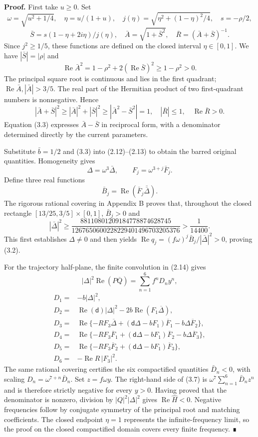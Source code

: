 \documentclass[a4paper,11pt]{article}
\begin{document}
\textbf{Proof.} First take \(u\ge0\). Set
\[
\omega=\sqrt{u^2+1/4},\quad \eta=u/(1+u),\quad
j(\eta)=\sqrt{\eta^2+(1-\eta)^2/4},\quad s=-\rho/2,
\]
\[
\bar S=s(1-\eta+2i\eta)/j(\eta),\quad
\bar A=\sqrt{1+\bar S^2},\quad \bar R=(\bar A+\bar S)^{-1}.
\tag{3.3}
\]
Since \(j^2\ge1/5\), these functions are defined on the closed interval \(\eta\in[0,1]\). We have \(|\bar S|=|\rho|\) and
\[
\operatorname{Re}\bar A^2
=1-\rho^2+2(\operatorname{Re}\bar S)^2\ge1-\rho^2>0.
\]
The principal square root is continuous and lies in the first quadrant; \(\operatorname{Re}\bar A,|\bar A|>3/5\). The real part of the Hermitian product of two first-quadrant numbers is nonnegative. Hence
\[
|\bar A+\bar S|^2\ge|\bar A|^2+|\bar S|^2
\ge|\bar A^2-\bar S^2|=1,\quad
|\bar R|\le1,\quad\operatorname{Re}\bar R>0.
\]
Equation (3.3) expresses \(\bar A-\bar S\) in reciprocal form, with a denominator determined directly by the current parameters.

Substitute \(\bar b=1/2\) and (3.3) into (2.12)–(2.13) to obtain the barred original quantities. Homogeneity gives
\[
\Delta=\omega^3\bar\Delta,\qquad F_j=\omega^{3+j}\bar F_j.
\tag{3.4}
\]
Define three real functions
\[
\bar B_j=\operatorname{Re}(\bar F_j\overline{\bar\Delta}).
\tag{3.5}
\]
The rigorous rational covering in Appendix B proves that, throughout the closed rectangle \([13/25,3/5]\times[0,1]\), \(\bar B_j>0\) and
\[
|\bar\Delta|^2\ge
\frac{88110801209184778874628745}{1267650600228229401496703205376}
>\frac1{14400}.
\tag{3.6}
\]
This first establishes \(\Delta\ne0\) and then yields
\(\operatorname{Re}q_j=(f\omega)^j\bar B_j/|\bar\Delta|^2>0\), proving (3.2).

For the trajectory half-plane, the finite convolution in (2.14) gives
\[
|\Delta|^2\operatorname{Re}(P\overline Q)
=\sum_{n=1}^6 f^nD_ny^n,
\tag{3.7}
\]
\[
\begin{aligned}
D_1={}&-b|\Delta|^2,\\
D_2={}&\operatorname{Re}(\mathsf d)|\Delta|^2-2b\operatorname{Re}(F_1\overline\Delta),\\
D_3={}&\operatorname{Re}\{-RF_3\overline\Delta+
(\mathsf d\Delta-bF_1)\overline F_1-b\Delta\overline F_2\},\\
D_4={}&\operatorname{Re}\{-RF_3\overline F_1+
(\mathsf d\Delta-bF_1)\overline F_2-b\Delta\overline F_3\},\\
D_5={}&\operatorname{Re}\{-RF_3\overline F_2+
(\mathsf d\Delta-bF_1)\overline F_3\},\\
D_6={}&-\operatorname{Re}R\,|F_3|^2.
\end{aligned}
\tag{3.8}
\]
The same rational covering certifies the six compactified quantities \(\bar D_n<0\), with scaling \(D_n=\omega^{7+n}\bar D_n\). Set \(z=f\omega y\). The right-hand side of (3.7) is
\(\omega^7\sum_{n=1}^6\bar D_nz^n\) and is therefore strictly negative for every \(y>0\). Having proved that the denominator is nonzero, division by \(|Q|^2|\Delta|^2\) gives \(\operatorname{Re}\widehat H<0\). Negative frequencies follow by conjugate symmetry of the principal root and matching coefficients. The closed endpoint \(\eta=1\) represents the infinite-frequency limit, so the proof on the closed compactified domain covers every finite frequency. ∎
\end{document}
